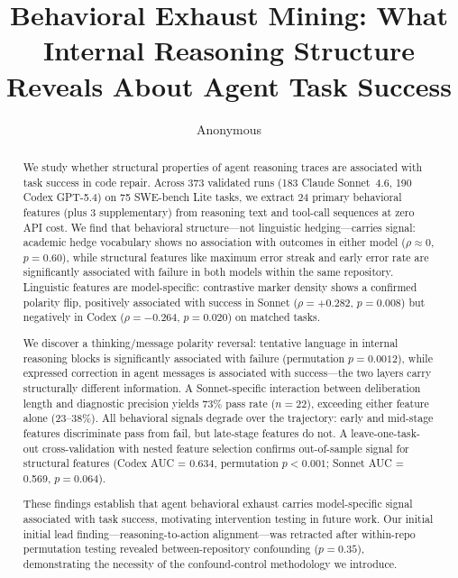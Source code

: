 \documentclass[11pt]{article}
\title{Behavioral Exhaust Mining: What Internal Reasoning Structure\\Reveals About Agent Task Success}
\author{Anonymous}
\date{}
\begin{document}
\maketitle

\begin{abstract}
We study whether structural properties of agent reasoning traces are associated with task success in code repair.
Across 373 validated runs (183 Claude Sonnet~4.6, 190 Codex GPT-5.4) on 75 SWE-bench Lite tasks, we extract 24 primary behavioral features (plus 3 supplementary) from reasoning text and tool-call sequences at zero API cost.
We find that behavioral structure---not linguistic hedging---carries signal: academic hedge vocabulary \citep{hyland2005metadiscourse} shows no association with outcomes in either model ($\rho \approx 0$, $p = 0.60$), while structural features like maximum error streak and early error rate are significantly associated with failure in both models within the same repository.
Linguistic features are model-specific: contrastive marker density shows a confirmed polarity flip, positively associated with success in Sonnet ($\rho = +0.282$, $p = 0.008$) but negatively in Codex ($\rho = -0.264$, $p = 0.020$) on matched tasks.

We discover a thinking/message polarity reversal: tentative language in internal reasoning blocks is significantly associated with failure (permutation $p = 0.0012$), while expressed correction in agent messages is associated with success---the two layers carry structurally different information.
A Sonnet-specific interaction between deliberation length and diagnostic precision yields 73\% pass rate ($n = 22$), exceeding either feature alone (23--38\%).
All behavioral signals degrade over the trajectory: early and mid-stage features discriminate pass from fail, but late-stage features do not.
A leave-one-task-out cross-validation with nested feature selection confirms out-of-sample signal for structural features (Codex AUC = 0.634, permutation $p < 0.001$; Sonnet AUC = 0.569, $p = 0.064$).

These findings establish that agent behavioral exhaust carries model-specific signal associated with task success, motivating intervention testing in future work.
Our initial initial lead finding---reasoning-to-action alignment---was retracted after within-repo permutation testing revealed between-repository confounding ($p = 0.35$), demonstrating the necessity of the confound-control methodology we introduce.
\end{abstract}
\end{document}
